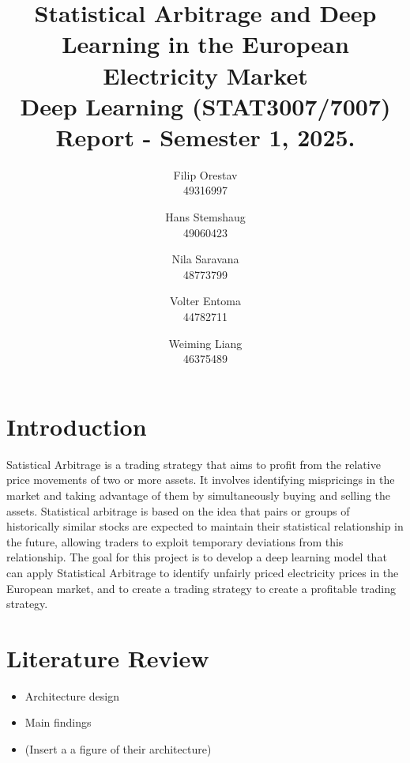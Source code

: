 \documentclass[12pt]{article}
\title{Statistical Arbitrage and Deep Learning in the European Electricity Market \\ Deep Learning (STAT3007/7007) \\ Report - Semester 1, 2025.}
\author{\normalsize
    Filip Orestav\\ \normalsize
    49316997
    \and \normalsize
    Hans Stemshaug\\ \normalsize
    49060423
    \and \normalsize
    Nila Saravana\\ \normalsize
    48773799
    \and \normalsize
    Volter Entoma\\ \normalsize
    44782711
    \and \normalsize
    Weiming Liang\\ \normalsize
    46375489
}
\begin{document}
\maketitle




\section{Introduction}

Satistical Arbitrage is a trading strategy that aims to profit from the relative price movements of two or more assets. \citep{avellaneda2010statistical} It involves identifying mispricings in the market and taking advantage of them by simultaneously buying and selling the assets. Statistical arbitrage is based on the idea that pairs or groups of historically similar stocks are expected to maintain their statistical relationship in the future, allowing traders to exploit temporary deviations from this relationship. The goal for this project is to develop a deep learning model that can apply Statistical Arbitrage to identify unfairly priced electricity prices in the European market, and to create a trading strategy to create a profitable trading strategy.

\clearpage




\section{Literature Review}

\citep{guijarro2021deep}

\begin{itemize}
    \item Architecture design
    \item Main findings 
    \item (Insert a a figure of their architecture)
\end{itemize}



\clearpage


\end{document}
